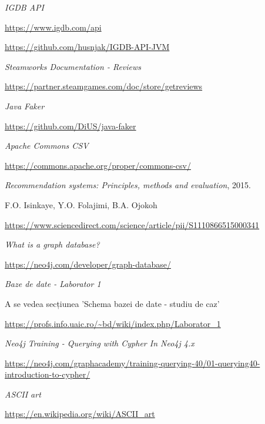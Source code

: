 \documentclass[12pt,a4paper]{report}
\begin{document}
\renewcommand\bibname{Bibliografie}
\begin{thebibliography}{9}

  
  \textit{IGDB API}
  
  \url{https://www.igdb.com/api}
  
  \url{https://github.com/husnjak/IGDB-API-JVM}
  
  
  \textit{Steamworks Documentation - Reviews}
  
  \url{https://partner.steamgames.com/doc/store/getreviews}
  
  
  \textit{Java Faker}
  
  \url{https://github.com/DiUS/java-faker}
  
  
  \textit{Apache Commons CSV}
  
  \url{https://commons.apache.org/proper/commons-csv/}


  
  \textit{Recommendation systems: Principles, methods and evaluation},
  2015.
  
  F.O. Isinkaye, Y.O. Folajimi, B.A. Ojokoh
  
  \url{https://www.sciencedirect.com/science/article/pii/S1110866515000341}
  
  
  \textit{What is a graph database?}
  
  \url{https://neo4j.com/developer/graph-database/}
  
  
  \textit{Baze de date - Laborator 1}
  
  A se vedea secțiunea 'Schema bazei de date - studiu de caz'
  
  
  \url{https://profs.info.uaic.ro/~bd/wiki/index.php/Laborator_1}
  
  
  \textit{Neo4j Training - Querying with Cypher In Neo4j 4.x}
  
  \url{https://neo4j.com/graphacademy/training-querying-40/01-querying40-introduction-to-cypher/}
  
  
  \textit{ASCII art}
  
  \url{https://en.wikipedia.org/wiki/ASCII_art}
  

\end{thebibliography}
\end{document}
